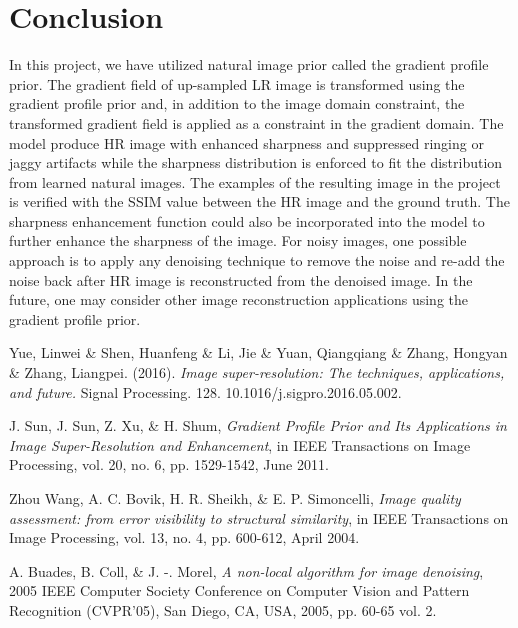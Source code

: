 \documentclass[a4paper,11pt]{article}
\begin{document}
\section{Conclusion}

In this project, we have utilized natural image prior called the gradient profile prior. The gradient field of up-sampled LR image is transformed using the gradient profile prior and, in addition to the image domain constraint, the transformed gradient field is applied as a constraint in the gradient domain. The model produce HR image with enhanced sharpness and suppressed ringing or jaggy artifacts while the sharpness distribution is enforced to fit the distribution from learned natural images. The examples of the resulting image in the project is verified with the SSIM value between the HR image and the ground truth. The sharpness enhancement function could also be incorporated into the model to further enhance the sharpness of the image. For noisy images, one possible approach is to apply any denoising technique to remove the noise and re-add the noise back after HR image is reconstructed from the denoised image. In the future, one may consider other image reconstruction applications using the gradient profile prior.

\begin{thebibliography}{10}

 {\sc Yue, Linwei \& Shen, Huanfeng \& Li, Jie \& Yuan, Qiangqiang \& Zhang, Hongyan \& Zhang, Liangpei.} (2016). {\em Image super-resolution: The techniques, applications, and future.} Signal Processing. 128. 10.1016/j.sigpro.2016.05.002. 

 {\sc J. Sun, J. Sun, Z. Xu, \& H. Shum}, {\em Gradient Profile Prior and Its Applications in Image Super-Resolution and Enhancement}, in IEEE Transactions on Image Processing, vol. 20, no. 6, pp. 1529-1542, June 2011.

 {\sc Zhou Wang, A. C. Bovik, H. R. Sheikh, \& E. P. Simoncelli}, {\em Image quality assessment: from error visibility to structural similarity}, in IEEE Transactions on Image Processing, vol. 13, no. 4, pp. 600-612, April 2004.

 {\sc A. Buades, B. Coll, \& J. -. Morel}, {\em A non-local algorithm for image denoising}, 2005 IEEE Computer Society Conference on Computer Vision and Pattern Recognition (CVPR'05), San Diego, CA, USA, 2005, pp. 60-65 vol. 2.

\end{thebibliography}
\end{document}
